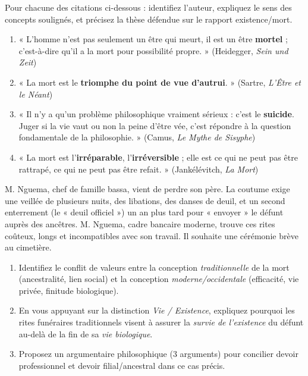 \documentclass[11pt]{article}
\newcounter{popsec}
\newcounter{popsub}
\newcommand{\courssub}[1]{%
  \stepcounter{popsub}%
  \par\vspace{9pt}\noindent{\popxbold\fontsize{11.5}{13}\selectfont\color{popink}{\color{poporange}\thepopsec.\thepopsub}\hspace{6pt}#1}\par\nopagebreak\vspace{4pt}
}
\begin{document}
\courssub{Je m'entraîne}

\begin{exercice}
Pour chacune des citations ci-dessous : identifiez l'auteur, expliquez le sens des concepts soulignés, et précisez la thèse défendue sur le rapport existence/mort.
\begin{enumerate}
\item « L'homme n'est pas seulement un être qui meurt, il est un être \textbf{mortel} ; c'est-à-dire qu'il a la mort pour possibilité propre. » (Heidegger, \emph{Sein und Zeit})
\item « La mort est le \textbf{triomphe du point de vue d'autrui}. » (Sartre, \emph{L'Être et le Néant})
\item « Il n'y a qu'un problème philosophique vraiment sérieux : c'est le \textbf{suicide}. Juger si la vie vaut ou non la peine d'être vée, c'est répondre à la question fondamentale de la philosophie. » (Camus, \emph{Le Mythe de Sisyphe})
\item « La mort est l'\textbf{irréparable}, l'\textbf{irréversible} ; elle est ce qui ne peut pas être rattrapé, ce qui ne peut pas être refait. » (Jankélévitch, \emph{La Mort})
\end{enumerate}
\end{exercice}

\begin{exercice}
M. Nguema, chef de famille bassa, vient de perdre son père. La coutume exige une veillée de plusieurs nuits, des libations, des danses de deuil, et un second enterrement (le « deuil officiel ») un an plus tard pour « envoyer » le défunt auprès des ancêtres. M. Nguema, cadre bancaire moderne, trouve ces rites coûteux, longs et incompatibles avec son travail. Il souhaite une cérémonie brève au cimetière.
\begin{enumerate}
\item Identifiez le conflit de valeurs entre la conception \emph{traditionnelle} de la mort (ancestralité, lien social) et la conception \emph{moderne/occidentale} (efficacité, vie privée, finitude biologique).
\item En vous appuyant sur la distinction \emph{Vie / Existence}, expliquez pourquoi les rites funéraires traditionnels visent à assurer la \emph{survie de l'existence} du défunt au-delà de la fin de sa \emph{vie biologique}.
\item Proposez un argumentaire philosophique (3 arguments) pour concilier devoir professionnel et devoir filial/ancestral dans ce cas précis.
\end{enumerate}
\end{exercice}
\end{document}
